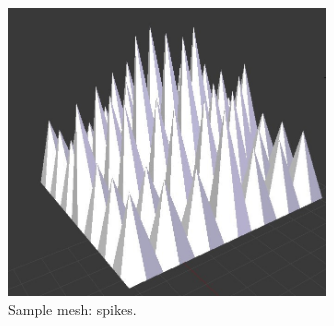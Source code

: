 \documentclass[12pt, titlepage]{article}
\begin{document}
\begin{figure}[hB]
\begin{center}
\includegraphics[width=0.75\textwidth]{spikes}
\caption{Sample mesh:  spikes.} \label{fig:spikes}
\end{center}
\end{figure}
\end{document}
